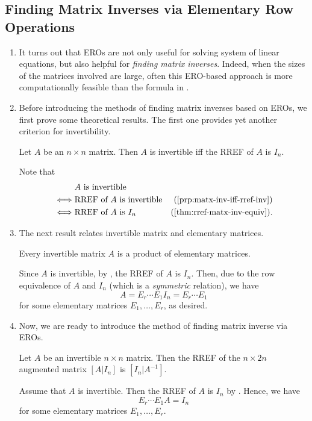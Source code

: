 \subsection{Finding Matrix Inverses via Elementary Row Operations}
\begin{enumerate}
\item It turns out that EROs are not only useful for solving system of linear
equations, but also helpful for \emph{finding matrix inverses}. Indeed, when
the sizes of the matrices involved are large, often this ERO-based approach is
more computationally feasible than the formula in .

\item Before introducing the methods of finding matrix inverses based on EROs,
we first prove some theoretical results. The first one provides yet another
criterion for invertibility.

\begin{proposition}
\label{prp:inv-iff-rref-identity}
Let \(A\) be an \(n\times n\) matrix. Then \(A\) is invertible iff the RREF of
\(A\) is \(I_n\).
\end{proposition}
\begin{pf}
Note that
\begin{align*}
&\text{\(A\) is invertible}\\
\iff&\text{RREF of \(A\) is invertible}&\text{(\Cref{prp:matx-inv-iff-rref-inv})}\\
\iff&\text{RREF of \(A\) is \(I_n\)}&\text{(\Cref{thm:rref-matx-inv-equiv})}.
\end{align*}
\end{pf}
\item The next result relates invertible matrix and elementary matrices.
\begin{corollary}
\label{cor:inv-matx-prod-elementary}
Every invertible matrix \(A\) is a product of elementary matrices.
\end{corollary}
\begin{pf}
Since \(A\) is invertible, by , the RREF of
\(A\) is \(I_n\). Then, due to the row equivalence of \(A\) and \(I_n\) (which
is a \emph{symmetric} relation), we have
\[
A=E_r\dotsb E_1I_n=E_r\dotsb E_1
\]
for some elementary matrices \(E_1,\dotsc,E_r\), as desired.
\end{pf}
\item Now, we are ready to introduce the method of finding matrix inverse via
EROs.

\begin{theorem}
\label{thm:find-inv-ero}
Let \(A\) be an invertible \(n\times n\) matrix. Then the RREF of the \(n\times
2n\) augmented matrix \([A|I_n]\) is \([I_n|A^{-1}]\).
\end{theorem}
\begin{pf}
Assume that \(A\) is invertible. Then the RREF of \(A\) is \(I_n\) by
. Hence, we have
\begin{equation}
\label{eq:inv-rref-identity}
E_r\dotsb E_1A=I_n
\end{equation}
for some elementary matrices \(E_1,\dotsc,E_r\).


\end{pf}
\end{enumerate}
